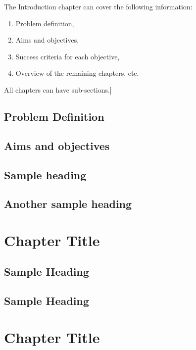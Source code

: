 The Introduction chapter can cover the following information:

\begin{enumerate}
	\item Problem definition,
	\item Aims and objectives,
	\item Success criteria for each objective,
	\item Overview of the remaining chapters, etc.
\end{enumerate}

All chapters can have sub-sections.]


\section{Problem Definition}




\section{Aims and objectives}




\section{Sample heading}



\section{Another sample heading}



\chapter{Chapter Title}
\thispagestyle{fancy} %

\section{Sample Heading}



\section{Sample Heading}




\chapter{Chapter Title}
\thispagestyle{fancy} %


